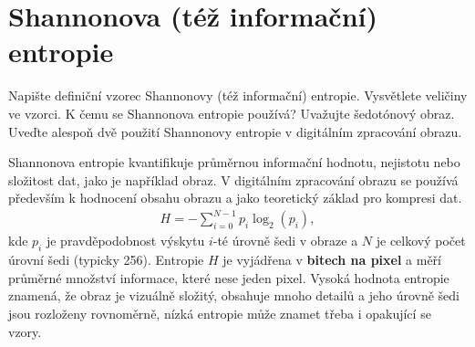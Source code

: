 \section{Shannonova (též informační) entropie}
Napište definiční vzorec Shannonovy (též informační) entropie. Vysvětlete veličiny ve vzorci. K čemu se 
Shannonova entropie používá? Uvažujte šedotónový obraz. Uveďte alespoň dvě použití Shannonovy entropie v digitálním 
zpracování obrazu.

Shannonova entropie kvantifikuje průměrnou informační hodnotu, nejistotu nebo složitost dat, jako je například obraz. 
V digitálním zpracování obrazu se používá především k hodnocení obsahu obrazu a jako teoretický základ pro kompresi dat.
\begin{align}
    H = - \sum_{i=0}^{N-1}p_i \log_2 (p_i),
\end{align}
kde $p_i$ je pravděpodobnost výskytu $i$-té úrovně šedi v obraze a $N$ je celkový počet úrovní šedi (typicky 256). 
Entropie $H$ je vyjádřena v \textbf{bitech na pixel} a měří průměrné množství informace, které nese jeden pixel. Vysoká
hodnota entropie znamená, že obraz je vizuálně složitý, obsahuje mnoho detailů a jeho úrovně šedi jsou rozloženy 
rovnoměrně, nízká entropie může znamet třeba i opakující se vzory.